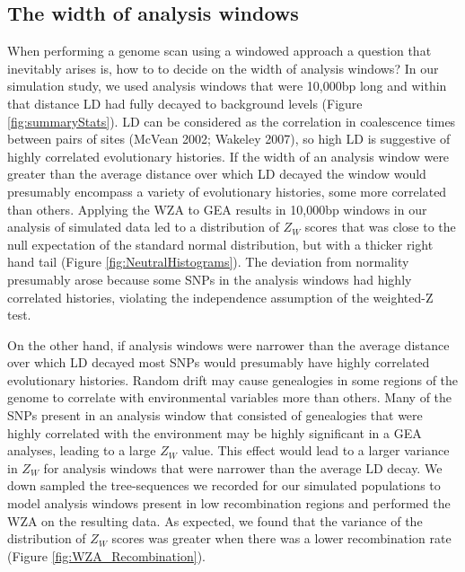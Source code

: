 \documentclass[10pt,twoside,lineno, twocolumn]{GSA_format}
\begin{document}
\subsection{The width of analysis windows}

When performing a genome scan using a windowed approach a question that inevitably arises is, how to to decide on the width of analysis windows? In our simulation study, we used analysis windows that were 10,000bp long and within that distance LD had fully decayed to background levels (Figure \ref{fig:summaryStats}). LD can be considered as the correlation in coalescence times between pairs of sites (McVean 2002; Wakeley 2007), so high LD is suggestive of highly correlated evolutionary histories. If the width of an analysis window were greater than the average distance over which LD decayed the window would presumably encompass a variety of evolutionary histories, some more correlated than others. Applying the WZA to GEA results in 10,000bp windows in our analysis of simulated data led to a distribution of $Z_W$ scores that was close to the null expectation of the standard normal distribution, but with a thicker right hand tail (Figure \ref{fig:NeutralHistograms}). The deviation from normality presumably arose because some SNPs in the analysis windows had highly correlated histories, violating the independence assumption of the weighted-Z test. 

On the other hand, if analysis windows were narrower than the average distance over which LD decayed most SNPs would presumably have highly correlated evolutionary histories. Random drift may cause genealogies in some regions of the genome to correlate with environmental variables more than others. Many of the SNPs present in an analysis window that consisted of genealogies that were highly correlated with the environment may be highly significant in a GEA analyses, leading to a large $Z_W$ value. This effect would lead to a larger variance in $Z_W$ for analysis windows that were narrower than the average LD decay. We down sampled the tree-sequences we recorded for our simulated populations to model analysis windows present in low recombination regions and performed the WZA on the resulting data. As expected, we found that the variance of the distribution of $Z_W$ scores was greater when there was a lower recombination rate (Figure \ref{fig:WZA_Recombination}). \\
\end{document}
